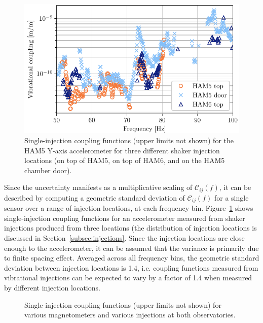 \begin{figure}[h!]
	\centering
	\includegraphics[width=\textwidth]{figures/injection-locations.pdf}
	\caption{
		Single-injection coupling functions (upper limits not shown) for the HAM5 Y-axis accelerometer for three different shaker injection locations (on top of HAM5, on top of HAM6, and on the HAM5 chamber door).}
	\label{fig:injection_locations}
\end{figure}

Since the uncertainty manifests as a multiplicative scaling of $\mathcal{C}_{ij}(f)$, it can be described by computing a geometric standard deviation of $\mathcal{C}_{ij}(f)$ for a single sensor over a range of injection locations, at each frequency bin.
Figure~\ref{fig:injection_locations} shows single-injection coupling functions for an accelerometer measured from shaker injections produced from three locations (the distribution of injection locations is discussed in Section~\ref{subsec:injections}.
Since the injection locations are close enough to the accelerometer, it can be assumed that the variance is primarily due to finite spacing effect.
Averaged across all frequency bins, the geometric standard deviation between injection locations is 1.4, i.e. coupling functions measured from vibrational injections can be expected to vary by a factor of 1.4 when measured by different injection locations.

\begin{figure}[h!]
	\centering
	\caption{
		Single-injection coupling functions (upper limits not shown) for various magnetometers and various injections at both observatories.}
	\label{fig:injection_locations_mag}
\end{figure}

